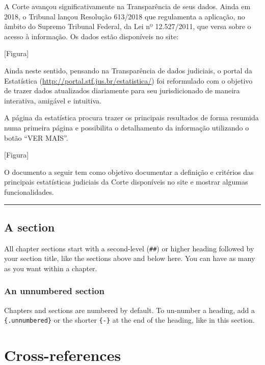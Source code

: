 \documentclass[
]{book}
\theoremstyle{definition}
\theoremstyle{definition}
\theoremstyle{definition}
\theoremstyle{definition}
\theoremstyle{remark}
\begin{document}
A Corte avançou significativamente na Transparência de seus dados. Ainda em 2018, o Tribunal lançou Resolução 613/2018 que regulamenta a aplicação, no âmbito do Supremo Tribunal Federal, da Lei nº 12.527/2011, que versa sobre o acesso à informação. Os dados estão disponíveis no site:

{[}Figura{]}

Ainda neste sentido, pensando na Transparência de dados judiciais, o portal da Estatística (\url{http://portal.stf.jus.br/estatistica/}) foi reformulado com o objetivo de trazer dados atualizados diariamente para seu jurisdicionado de maneira interativa, amigável e intuitiva.

A página da estatística procura trazer os principais resultados de forma resumida numa primeira página e possibilita o detalhamento da informação utilizando o botão ``VER MAIS''.

{[}Figura{]}

O documento a seguir tem como objetivo documentar a definição e critérios das principais estatísticas judiciais da Corte disponíveis no site e mostrar algumas funcionalidades.

\begin{center}\rule{0.5\linewidth}{0.5pt}\end{center}

\hypertarget{a-section}{%
\section{A section}\label{a-section}}

All chapter sections start with a second-level (\texttt{\#\#}) or higher heading followed by your section title, like the sections above and below here. You can have as many as you want within a chapter.

\hypertarget{an-unnumbered-section}{%
\subsection*{An unnumbered section}\label{an-unnumbered-section}}

Chapters and sections are numbered by default. To un-number a heading, add a \texttt{\{.unnumbered\}} or the shorter \texttt{\{-\}} at the end of the heading, like in this section.

\hypertarget{cross}{%
\chapter{Cross-references}\label{cross}}
\end{document}
